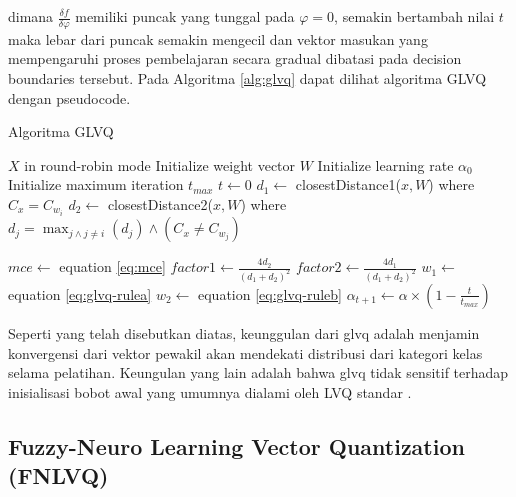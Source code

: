 \noindent dimana $\frac{\delta f}{\delta \varphi}$ memiliki puncak yang
tunggal pada $\varphi=0$, semakin bertambah nilai $t$ maka lebar dari puncak
semakin mengecil dan vektor masukan yang mempengaruhi proses pembelajaran secara
gradual dibatasi pada decision boundaries tersebut. Pada Algoritma
\ref{alg:glvq} dapat dilihat algoritma GLVQ dengan pseudocode.

\begin{algorithm}  
\scriptsize 
\caption{Algoritma GLVQ}          
\label{alg:glvq}                           
\begin{algorithmic}                    %
	\REQUIRE $X$ in round-robin mode
	\STATE Initialize weight vector $W$
	\STATE Initialize learning rate $\alpha_0$
	\STATE Initialize maximum iteration $t_{max}$
	\STATE $t \leftarrow 0$
			\STATE $d_1 \leftarrow $ closestDistance1($x, W$) where $C_x = C_{w_i}$
			\STATE $d_2 \leftarrow $ closestDistance2($x, W$) where $d_j = \max_{j
			\wedge j \neq i}(d_j) \wedge (C_x \neq C_{w_j})$
			
			\STATE $mce \leftarrow $ equation \ref{eq:mce}
			\STATE $factor1 \leftarrow \frac{4d_2}{(d_1 + d_2)^2}$ 
			\STATE $factor2 \leftarrow \frac{4d_1}{(d_1 + d_2)^2}$ 
			\STATE
			\STATE {}
			\STATE $w_{1} \leftarrow $ equation \ref{eq:glvq-rulea}
			\STATE
			\STATE {}
			\STATE $w_{2} \leftarrow $ equation \ref{eq:glvq-ruleb}
		\ENDFOR
	\ENDWHILE
	\STATE $\alpha_{t+1} \leftarrow \alpha \times (1 - \frac{t}{t_{max}})$ 
\end{algorithmic}
\end{algorithm}  
 
Seperti yang telah disebutkan diatas, keunggulan dari \gls{glvq} adalah menjamin
konvergensi dari vektor pewakil akan mendekati distribusi dari kategori kelas selama
pelatihan. Keungulan yang lain adalah bahwa \gls{glvq} tidak sensitif terhadap
inisialisasi bobot awal yang umumnya dialami oleh LVQ standar \cite{Sato:1999}. 

 
\subsection{Fuzzy-Neuro Learning Vector Quantization (FNLVQ)}

